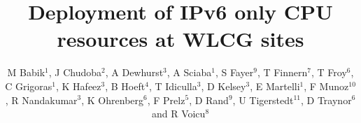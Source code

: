 \documentclass[a4paper]{jpconf}
\begin{document}
\title{Deployment of IPv6 only CPU resources at WLCG sites}


\author{M Babik$^1$, J Chudoba$^2$, A Dewhurst$^3$, A Sciaba$^1$, S Fayer$^9$, T Finnern$^7$,  T Froy$^6$, C Grigoras$^1$, K Hafeez$^3$, B Hoeft$^4$, T Idiculla$^3$, D Kelsey$^3$, E Martelli$^1$, F Munoz$^{10}$, R Nandakumar$^3$,  K Ohrenberg$^6$, F Prelz$^5$,  D Rand$^9$, U Tigerstedt$^{11}$, D Traynor$^6$ and R Voicu$^8$}


\address{$^1$ CERN, CH-1211 Gen\`{e}ve 23, Switzerland}
\address{$^2$ Institute of Physics, Academy of Sciences of the Czech Republic Na Slovance 2 182 21 Prague 8, Czech Republic}
\address{$^3$ STFC - Rutherford Appleton Lab. UK}
\address{$^4$ Karlsruher Institut f\"{u}r Technologie, Hermann-von-Helmholtz-Platz 1, D-76344 Eggenstein-Leopoldshafen, Germany}
\address{$^5$ INFN, Sezione di Milano, via G. Celoria 16, I-20133 Milano, Italy}
\address{$^6$ Queen Mary University of London, Mile End Road, London E1 4NS, United Kingdom}
\address{$^7$ Deutsches Elektronen-Synchrotron, Notkestra{\ss}e 85, D-22607 Hamburg, Germany}
\address{$^8$ California Institute of Technology, Pasadena, Ca 91125, U.S.A.}
\address{$^9$ Imperial College London, South Kensington Campus, London SW7 2AZ, United Kingdom}
\address{$^{10}$ Port d’Informaci\'{o} Cient\'{i}fica (PIC), Universitat Aut\`{o}noma de Barcelona, Bellaterra (Barcelona), Spain}
\address{$^{11}$ CSC Tieteen Tietotekniikan Keskus Oy, P.O. Box 405, FI-02101 Espoo, Finland}

\end{document}
